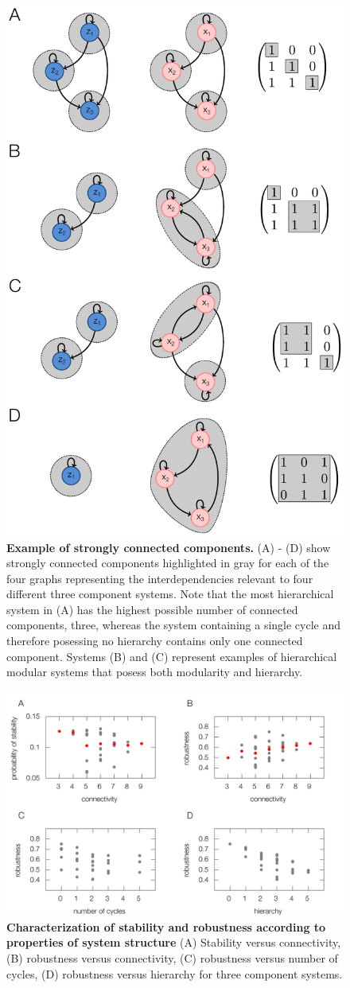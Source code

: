 \begin{figure}[!ht]
\centering
\noindent\includegraphics[width=0.4\columnwidth]{fig/scc2.pdf}
\caption{{\bf Example of strongly connected components.} (A) - (D) show strongly connected components highlighted in gray for each of the four graphs representing the interdependencies relevant to four different three component systems. Note that the most hierarchical system in (A) has the highest possible number of connected components, three, whereas the system containing a single cycle and therefore posessing no hierarchy contains only one connected component. Systems (B) and (C) represent examples of hierarchical modular systems that posess both modularity and hierarchy.}
\label{fig:scc}
\end{figure}

\pagebreak

\begin{figure}[!ht]
\centering
\noindent\includegraphics[width=1.0\columnwidth]{fig/combinedfigs.pdf}
\caption{{\bf Characterization of stability and robustness according to properties of system structure} (A) Stability versus connectivity, (B) robustness versus connectivity, (C) robustness versus number of cycles, (D) robustness versus hierarchy for three component systems.
}
\label{fig:combined}
\end{figure}

